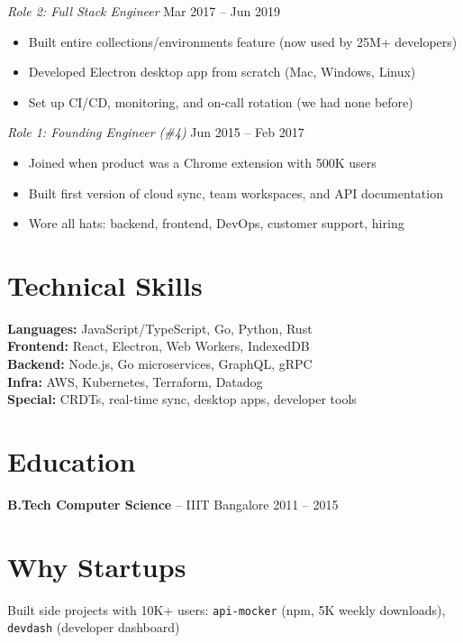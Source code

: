 \documentclass[10pt,letterpaper]{article}
\begin{document}
\textit{\color{startorange}Role 2: Full Stack Engineer} \hfill Mar 2017 -- Jun 2019
\begin{itemize}
\item Built entire collections/environments feature (now used by 25M+ developers)
\item Developed Electron desktop app from scratch (Mac, Windows, Linux)
\item Set up CI/CD, monitoring, and on-call rotation (we had none before)
\end{itemize}

\textit{\color{startorange}Role 1: Founding Engineer (\#4)} \hfill Jun 2015 -- Feb 2017
\begin{itemize}
\item Joined when product was a Chrome extension with 500K users
\item Built first version of cloud sync, team workspaces, and API documentation
\item Wore all hats: backend, frontend, DevOps, customer support, hiring
\end{itemize}

\section{Technical Skills}
\textbf{Languages:} JavaScript/TypeScript, Go, Python, Rust\\
\textbf{Frontend:} React, Electron, Web Workers, IndexedDB\\
\textbf{Backend:} Node.js, Go microservices, GraphQL, gRPC\\
\textbf{Infra:} AWS, Kubernetes, Terraform, Datadog\\
\textbf{Special:} CRDTs, real-time sync, desktop apps, developer tools

\section{Education}
\textbf{B.Tech Computer Science} -- IIIT Bangalore \hfill 2011 -- 2015

\section{Why Startups}
Built side projects with 10K+ users: \texttt{api-mocker} (npm, 5K weekly downloads), \texttt{devdash} (developer dashboard)
\end{document}
